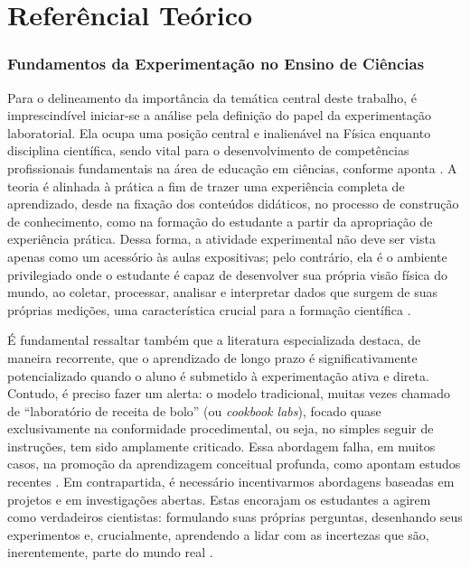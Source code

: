 \chapter[Referêncial Teórico]{Referêncial Teórico}
\label{cap_exemplos}

\subsection{Fundamentos da Experimentação no Ensino de Ciências}
Para o delineamento da importância da temática central deste trabalho, é imprescindível iniciar-se a análise pela definição do papel da experimentação laboratorial. Ela ocupa uma posição central e inalienável na Física enquanto disciplina científica, sendo vital para o desenvolvimento de competências profissionais fundamentais na área de educação em ciências, conforme aponta \cite{blind}. A teoria é alinhada à prática a fim de trazer uma experiência completa de aprendizado, desde na fixação dos conteúdos didáticos, no processo de construção de conhecimento, como na formação do estudante a partir da apropriação de experiência prática. Dessa forma, a atividade experimental não deve ser vista apenas como um acessório às aulas expositivas; pelo contrário, ela é o ambiente privilegiado onde o estudante é capaz de desenvolver sua própria visão física do mundo, ao coletar, processar, analisar e interpretar dados que surgem de suas próprias medições, uma característica crucial para a formação científica \cite{transforming}.

É fundamental ressaltar também que a literatura especializada destaca, de maneira recorrente, que o aprendizado de longo prazo é significativamente potencializado quando o aluno é submetido à experimentação ativa e direta. Contudo, é preciso fazer um alerta: o modelo tradicional, muitas vezes chamado de ``laboratório de receita de bolo'' (ou \textit{cookbook labs}), focado quase exclusivamente na conformidade procedimental, ou seja, no simples seguir de instruções, tem sido amplamente criticado. Essa abordagem falha, em muitos casos, na promoção da aprendizagem conceitual profunda, como apontam estudos recentes \cite{smartphone}. Em contrapartida, é necessário incentivarmos abordagens baseadas em projetos e em investigações abertas. Estas encorajam os estudantes a agirem como verdadeiros cientistas: formulando suas próprias perguntas, desenhando seus experimentos e, crucialmente, aprendendo a lidar com as incertezas que são, inerentemente, parte do mundo real \cite{vidal}.

